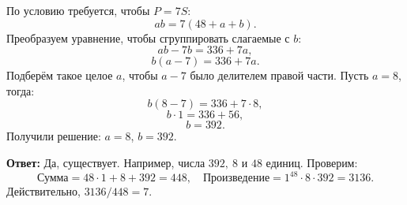 \documentclass[12pt, a4paper]{article}
\begin{document}
\begin{enumerate}[label=\arabic*., wide=0pt, leftmargin=*]
    По условию требуется, чтобы $P = 7S$:
    \[
    ab = 7(48 + a + b).
    \]
    Преобразуем уравнение, чтобы сгруппировать слагаемые с $b$:
    \[
    ab - 7b = 336 + 7a,
    \]
    \[
    b(a - 7) = 336 + 7a.
    \]
    Подберём такое целое $a$, чтобы $a-7$ было делителем правой части. Пусть $a = 8$, тогда:
    \[
    b(8 - 7) = 336 + 7 \cdot 8,
    \]
    \[
    b \cdot 1 = 336 + 56,
    \]
    \[
    b = 392.
    \]
    Получили решение: $a=8$, $b=392$.

    \textbf{Ответ:} Да, существует. Например, числа $392,\ 8$ и $48$ единиц. Проверим:
    \[
    \text{Сумма} = 48 \cdot 1 + 8 + 392 = 448, \quad \text{Произведение} = 1^{48} \cdot 8 \cdot 392 = 3136.
    \]
    Действительно, $3136 / 448 = 7$.
\end{enumerate}
\end{document}
